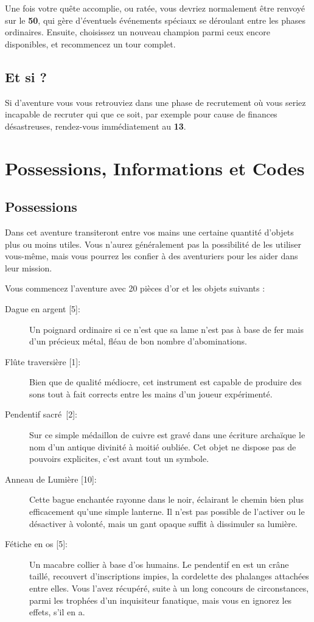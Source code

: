 \documentclass{report}
\begin{document}
Une fois votre quête accomplie, ou ratée, vous devriez normalement être renvoyé sur le \textbf{50}, qui gère d'éventuels événements spéciaux se déroulant entre les phases ordinaires. Ensuite, choisissez un nouveau champion parmi ceux encore disponibles, et recommencez un tour complet.

\subsection{Et si ?}

Si d'aventure vous vous retrouviez dans une phase de recrutement où vous seriez incapable de recruter qui que ce soit, par exemple pour cause de finances désastreuses, rendez-vous immédiatement au \textbf{13}.

\section{Possessions, Informations et Codes}

\subsection{Possessions}

Dans cet aventure transiteront entre vos mains une certaine quantité d'objets plus ou moins utiles. Vous n'aurez généralement pas la possibilité de les utiliser vous-même, mais vous pourrez les confier à des aventuriers pour les aider dans leur mission.

Vous commencez l'aventure avec 20 pièces d'or et les objets suivants :
\begin{description}
\item[{Dague en argent [5]}:] Un poignard ordinaire si ce n'est que sa lame n'est pas à base de fer mais d'un précieux métal, fléau de bon nombre d'abominations.
\item[{Flûte traversière [1]}:] Bien que de qualité médiocre, cet instrument est capable de produire des sons tout à fait corrects entre les mains d'un joueur expérimenté.
\item[{Pendentif sacré [2]}:] Sur ce simple médaillon de cuivre est gravé dans une écriture archaïque le nom d'un antique divinité à moitié oubliée. Cet objet ne dispose pas de pouvoirs explicites, c'est avant tout un symbole.
\item[{Anneau de Lumière [10]}:] Cette bague enchantée rayonne dans le noir, éclairant le chemin bien plus  efficacement qu'une simple lanterne. Il n'est pas possible de l'activer ou le désactiver à volonté, mais un gant opaque suffit à dissimuler sa lumière.
\item[{Fétiche en os [5]}:] Un macabre collier à base d'os humains. Le pendentif en est un crâne taillé, recouvert d'inscriptions impies, la cordelette des phalanges attachées entre elles. Vous l'avez récupéré, suite à un long concours de circonstances, parmi les trophées d'un inquisiteur fanatique, mais vous en ignorez les effets, s'il en a.
\end{description}
\end{document}

